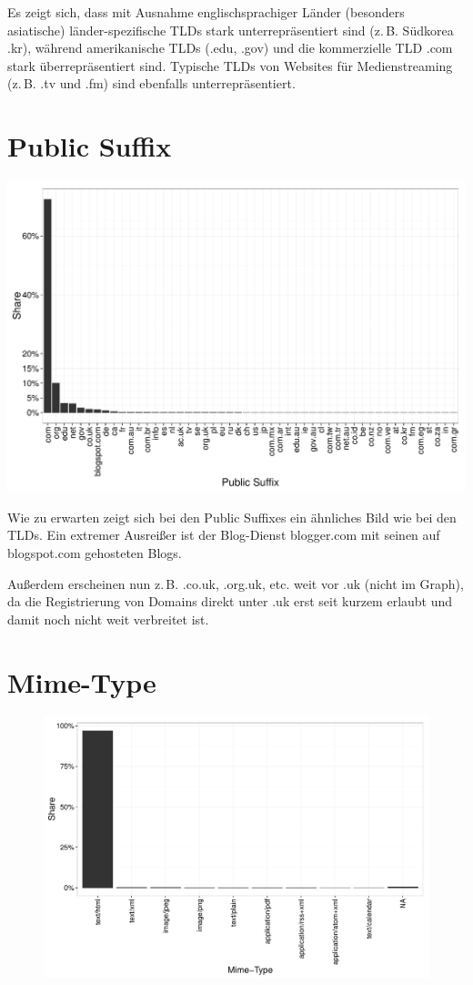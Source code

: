 \documentclass[a4paper,12pt,titlepage=false]{scrreprt}
\begin{document}
Es zeigt sich, dass mit Ausnahme englischsprachiger Länder (besonders asiatische) länder-spezifische TLDs stark unterrepräsentiert sind (z.\,B. Südkorea .kr), während amerikanische TLDs (.edu, .gov) und die kommerzielle TLD .com stark überrepräsentiert sind. Typische TLDs von Websites für Medienstreaming (z.\,B. .tv und .fm) sind ebenfalls unterrepräsentiert.

\section{Public Suffix}

\begin{center}
    \includegraphics[width=.9\textwidth]{plots/plot_pub_suffixes_top50}
\end{center}

\noindent
Wie zu erwarten zeigt sich bei den Public Suffixes ein ähnliches Bild wie bei den TLDs. Ein extremer Ausreißer ist der Blog-Dienst blogger.com mit seinen auf blogspot.com gehosteten Blogs.

Außerdem erscheinen nun z.\,B. .co.uk, .org.uk, etc. weit vor .uk (nicht im Graph), da die Registrierung von Domains direkt unter .uk erst seit kurzem erlaubt und damit noch nicht weit verbreitet ist.

\section{Mime-Type}

\begin{figure}
    \includegraphics[width=.6\textwidth]{plots/plot_mime}
\end{figure}
\end{document}
